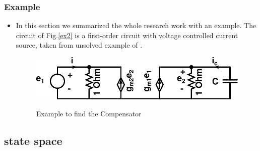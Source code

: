 \documentclass{beamer}
\begin{document}
\begin{frame}
\frametitle{Example}

\begin{small}
        \begin{itemize}
	\item{In this section we summarized the whole research work with an  example.
The circuit of Fig.\ref{ex2} is a first-order circuit with voltage controlled current source, taken from unsolved example of \cite{Chua}.
\begin{figure}[h!]
\centering
{\label{method}\includegraphics[totalheight=.2\textheight,width=.6\textwidth]{images/ex3a}}
\caption{Example to find the Compensator}
\label{ex3a}
\end{figure}}



         \end{itemize}
\end{small}

\let\thefootnote\relax{}	

\end{frame}



\subsection*{state space}
\end{document}
